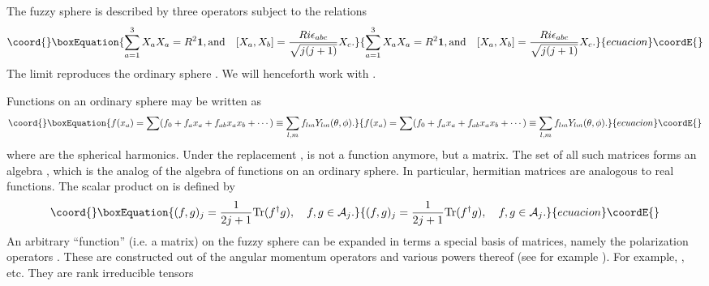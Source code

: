 \documentclass[a4paper,12pt]{article}
\numberwithin{equation}{section}
\begin{document}
The fuzzy sphere \coordHE{} is described by three operators \coordHE{}
subject to the relations 
\begin{equation}\coord{}\boxEquation{
\sum_{a=1}^3 X_a X_a = R^2 {\bf 1}, \text{and} \quad [X_a, X_b] =
\frac{R i \epsilon_{abc}}{\sqrt{j(j+1)}}X_c.
}{
\sum_{a=1}^3 X_a X_a = R^2 {\bf 1}, \text{and} \quad [X_a, X_b] =
\frac{R i \epsilon_{abc}}{\sqrt{j(j+1)}}X_c.
}{ecuacion}\coordE{}\end{equation} 
The limit \coordHE{} reproduces the ordinary sphere
\coordHE{}. We will henceforth work with \coordHE{}.

Functions on an ordinary sphere may be written as
\begin{equation}\coord{}\boxEquation{ 
f(x_a) = \sum(f_0 + f_a x_a + f_{ab}x_a x_b + \cdots) \equiv \sum_{l,m}
f_{lm} Y_{lm}(\theta, \phi).
}{ 
f(x_a) = \sum(f_0 + f_a x_a + f_{ab}x_a x_b + \cdots) \equiv \sum_{l,m}
f_{lm} Y_{lm}(\theta, \phi).
}{ecuacion}\coordE{}\end{equation}
where \coordHE{} are the spherical harmonics. Under the
replacement \coordHE{}, \coordHE{} is not a
function anymore, but a \coordHE{} matrix. The set of all
such matrices forms an algebra \coordHE{}, which is the analog of
the algebra of functions on an ordinary sphere. In particular,
hermitian matrices are analogous to real functions. The scalar product
on \coordHE{} is defined by
\begin{equation}\coord{}\boxEquation{ 
(f, g)_j = \frac{1}{2j+1} \text{Tr}(f^{\dagger} g), \quad f,g \in
{\cal A}_j.
\label{innerprod}
}{ 
(f, g)_j = \frac{1}{2j+1} \text{Tr}(f^{\dagger} g), \quad f,g \in
{\cal A}_j.
}{ecuacion}\coordE{}\end{equation} 
An arbitrary ``function'' (i.e. a matrix) on the fuzzy sphere can be
expanded in terms a special basis of matrices, namely the polarization
operators \coordHE{}. These are constructed out of the angular
momentum operators \coordHE{} and various powers
thereof (see for example \cite{vmkBook}). For example, \coordHE{}, etc. They are rank
\coordHE{} irreducible tensors
\end{document}
